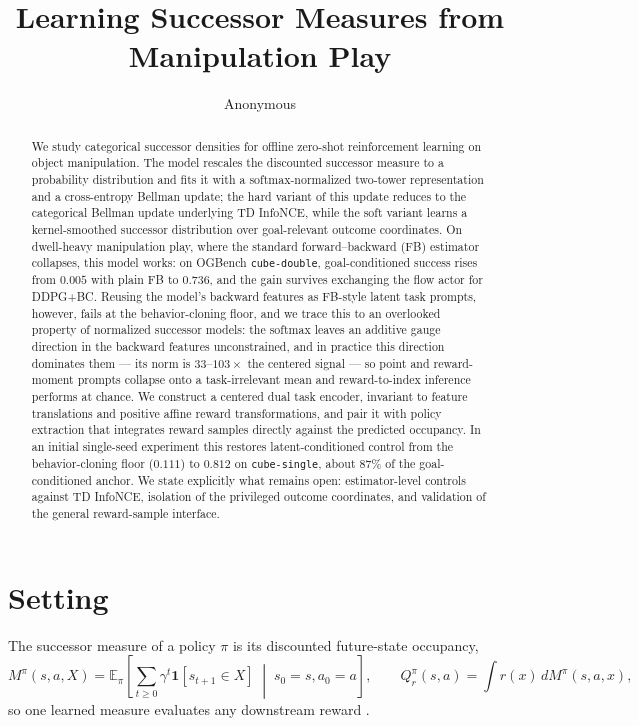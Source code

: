 \documentclass{article}
\title{Learning Successor Measures from Manipulation Play}
\author{Anonymous}
\newcommand{\E}{\mathbb{E}}
\newcommand{\ind}[1]{\mathbf{1}\!\left[#1\right]}
\begin{document}
\maketitle

\begin{abstract}
We study categorical successor densities for offline zero-shot reinforcement learning on object manipulation.
The model rescales the discounted successor measure to a probability distribution and fits it with a softmax-normalized two-tower representation and a cross-entropy Bellman update; the hard variant of this update reduces to the categorical Bellman update underlying TD InfoNCE, while the soft variant learns a kernel-smoothed successor distribution over goal-relevant outcome coordinates.
On dwell-heavy manipulation play, where the standard forward--backward (FB) estimator collapses, this model works: on OGBench \texttt{cube-double}, goal-conditioned success rises from $0.005$ with plain FB to $0.736$, and the gain survives exchanging the flow actor for DDPG+BC.
Reusing the model's backward features as FB-style latent task prompts, however, fails at the behavior-cloning floor, and we trace this to an overlooked property of normalized successor models: the softmax leaves an additive gauge direction in the backward features unconstrained, and in practice this direction dominates them --- its norm is $33$--$103\times$ the centered signal --- so point and reward-moment prompts collapse onto a task-irrelevant mean and reward-to-index inference performs at chance.
We construct a centered dual task encoder, invariant to feature translations and positive affine reward transformations, and pair it with policy extraction that integrates reward samples directly against the predicted occupancy.
In an initial single-seed experiment this restores latent-conditioned control from the behavior-cloning floor ($0.111$) to $0.812$ on \texttt{cube-single}, about $87\%$ of the goal-conditioned anchor.
We state explicitly what remains open: estimator-level controls against TD InfoNCE, isolation of the privileged outcome coordinates, and validation of the general reward-sample interface.
\end{abstract}

\section{Setting}
\label{sec:prelim}

The successor measure of a policy $\pi$ is its discounted future-state occupancy,
\begin{equation}
\label{eq:sm}
M^\pi(s,a,X) = \E_\pi\!\left[ \sum_{t\ge0}\gamma^t \ind{s_{t+1}\in X} \;\middle|\; s_0=s,a_0=a \right], \qquad Q_r^\pi(s,a) = \int r(x)\,dM^\pi(s,a,x),
\end{equation}
so one learned measure evaluates any downstream reward
\citep{dayan1993improving,blier2021learning}.
\end{document}
